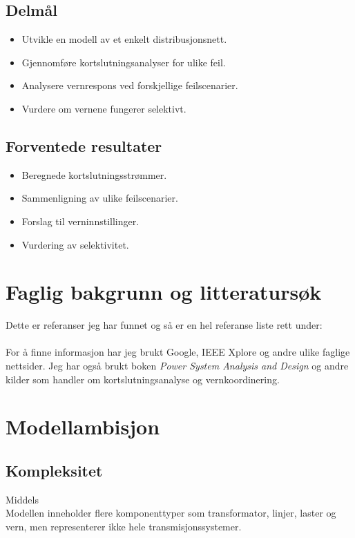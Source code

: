 \documentclass{article}
\begin{document}
\subsection{Delmål}
\begin{itemize}
    \item Utvikle en modell av et enkelt distribusjonsnett.
    \item Gjennomføre kortslutningsanalyser for ulike feil.
    \item Analysere vernrespons ved forskjellige feilscenarier.
    \item Vurdere om vernene fungerer selektivt.
\end{itemize}

\subsection{Forventede resultater}
\begin{itemize}
    \item Beregnede kortslutningsstrømmer.
    \item Sammenligning av ulike feilscenarier.
    \item Forslag til verninnstillinger.
    \item Vurdering av selektivitet.
\end{itemize}


\section{Faglig bakgrunn og litteratursøk}
Dette er referanser jeg har funnet og så er en hel referanse liste rett under:\cite{relayreview}\cite{abb_coordination}\cite
{glover}\\
\\
For å finne informasjon har jeg brukt Google, IEEE Xplore og andre ulike faglige nettsider. Jeg har også brukt boken \textit{Power System Analysis and Design} og andre kilder som handler om kortslutningsanalyse og vernkoordinering.

 

\newpage
\section{Modellambisjon}
\subsection{Kompleksitet}
Middels\\
Modellen inneholder flere komponenttyper som transformator, linjer, laster og vern, men representerer ikke hele transmisjonssystemer.
\end{document}

